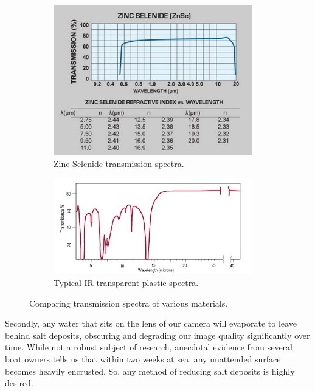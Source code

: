 \begin{figure}[h]
\centering
\begin{subfigure}{0.4\textwidth}
 \centering
 \includegraphics[width=0.95\textwidth]{"./image/zinc_selenide_spectra"}
 \caption{Zinc Selenide transmission spectra.}
 \label{fig:spectra:sub1}
\end{subfigure}
\begin{subfigure}{0.4\textwidth}
 \centering
 \includegraphics[width=0.95\textwidth]{"./image/edmund_plastic_spectra"}
 \caption{Typical IR-transparent plastic spectra.}
 \label{fig:spectra:sub2}
\end{subfigure}
\caption{Comparing transmission spectra of various materials.}
\label{fig:spectra}
\end{figure}

Secondly, any water that sits on the lens of our camera will evaporate to leave behind salt deposits, obscuring and degrading our image quality significantly over time. While not a robust subject of research, anecdotal evidence from several boat owners tells us that within two weeks at sea, any unattended surface becomes heavily encrusted. So, any method of reducing salt deposits is highly desired. 

